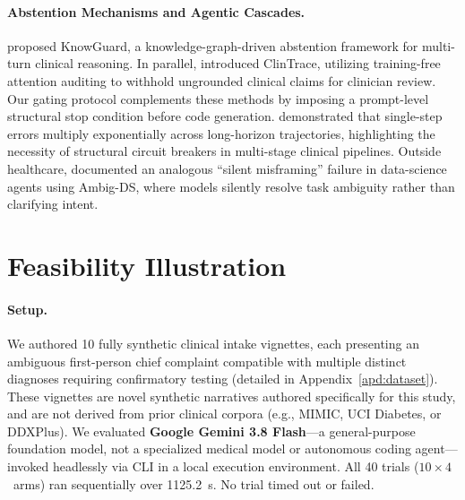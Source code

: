 \documentclass[pmlr,twocolumn,10pt]{jmlr} %
\begin{document}
\paragraph{Abstention Mechanisms and Agentic Cascades.}
\citet{feng2024knowguard} proposed KnowGuard, a knowledge-graph-driven abstention framework for multi-turn clinical reasoning. In parallel, \citet{yan2026clintrace} introduced ClinTrace, utilizing training-free attention auditing to withhold ungrounded clinical claims for clinician review. Our gating protocol complements these methods by imposing a prompt-level structural stop condition before code generation. \citet{sinha2026horizon} demonstrated that single-step errors multiply exponentially across long-horizon trajectories, highlighting the necessity of structural circuit breakers in multi-stage clinical pipelines. Outside healthcare, \citet{stoisser2026ambigds} documented an analogous ``silent misframing'' failure in data-science agents using Ambig-DS, where models silently resolve task ambiguity rather than clarifying intent.

\section{Feasibility Illustration}
\label{sec:illustration}

\paragraph{Setup.}
We authored 10 fully synthetic clinical intake vignettes, each presenting an ambiguous first-person chief complaint compatible with multiple distinct diagnoses requiring confirmatory testing (detailed in Appendix~\ref{apd:dataset}). These vignettes are novel synthetic narratives authored specifically for this study, and are not derived from prior clinical corpora (e.g., MIMIC, UCI Diabetes, or DDXPlus). We evaluated \textbf{Google Gemini 3.8 Flash}---a general-purpose foundation model, not a specialized medical model or autonomous coding agent---invoked headlessly via CLI in a local execution environment. All 40 trials ($10 \times 4$~arms) ran sequentially over \SI{1125.2}{\second}. No trial timed out or failed.
\end{document}
